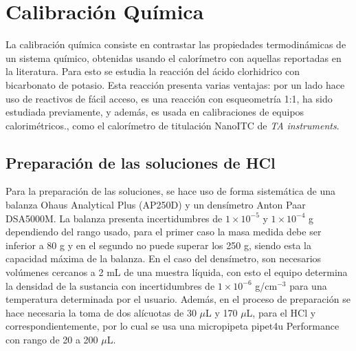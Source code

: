 
%




\chapter{Calibraci\'on Qu\'imica}\label{ch: chemical}
	La calibraci\'on qu\'imica consiste en contrastar las propiedades termodin\'amicas de un sistema qu\'imico, obtenidas usando el calor\'imetro con aquellas reportadas en la literatura. Para esto se estudia la reacci\'on del \'acido clorhidrico con bicarbonato de potasio. Esta reacci\'on presenta varias ventajas: por un lado hace uso de reactivos de f\'acil acceso, es una reacci\'on con esqueometr\'ia 1:1, ha sido estudiada previamente, y adem\'as, es usada en calibraciones de equipos calorim\'etricos., como el calor\'imetro de titulaci\'on NanoITC de \textit{TA instruments}.
	
\section{Preparaci\'on de las soluciones de HCl}\label{sec: soluciones}
	Para la preparaci\'on de las soluciones, se hace uso de forma sistem\'atica de una balanza Ohaus Analytical Plus (AP250D) y un dens\'imetro Anton Paar DSA5000M. La balanza presenta incertidumbres de $1\times10^{-5}$ y $1\times10^{-4}$ g dependiendo del rango usado, para el primer caso la masa medida debe ser inferior a 80 g y en el segundo no puede superar los 250 g, siendo esta la capacidad máxima de la balanza. En el caso del densímetro, son necesarios volúmenes cercanos a 2 mL de una muestra líquida, con esto el equipo determina la densidad de la sustancia con incertidumbres de $1\times10^{-6}$ g/cm$^{-3}$ para una temperatura determinada por el usuario. Adem\'as, en el proceso de preparaci\'on se hace necesaria la toma de dos al\'icuotas de 30 $\mu$L y 170 $\mu$L, para el HCl y  correspondientemente, por lo cual se usa una micropipeta pipet4u Performance con rango de 20 a 200 $\mu$L.
	
